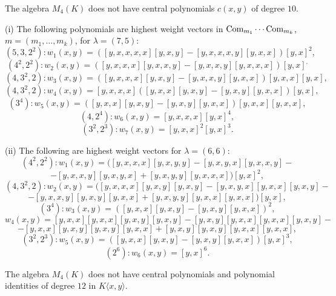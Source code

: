 \documentclass[10pt,a4paper]{amsart}
\begin{document}
\begin{proposition}\label{no central polynomials of degree 10}
The algebra $M_4(K)$ does not have central polynomials $c(x,y)$ of degree $10$.
\end{proposition}

\begin{lemma}\label{HWV of degree 12}
{\rm (i)} The following polynomials are highest weight vectors in $\text{\rm Com}_{m_1}\cdots \text{\rm Com}_{m_k}$, $m=(m_1,\ldots,m_k)$, for $\lambda=(7,5)$:
\[
(5,3,2^2):w_1(x,y)=([y,x,x,x,x][y,x,y]-[y,x,x,x,y][y,x,x])[y,x]^2, %
\]
\[
(4^2,2^2):w_2(x,y)=([y,x,x,x][y,x,x,y]-[y,x,x,y][y,x,x,x])[y,x]^, %
\]
\[
(4,3^2,2):w_3(x,y)=([y,x,x,x][y,x,y]-[y,x,x,y][y,x,x])[y,x,x][y,x], %
\]
\[
(4,3^2,2):w_4(x,y)=[y,x,x,x]([y,x,x][y,x,y]-[y,x,y][y,x,x])[y,x], %
\]
\[
(3^4):w_5(x,y)=([y,x,x][y,x,y]-[y,x,y][y,x,x])[y,x,x][y,x,x],%
\]
\[
(4,2^4):w_6(x,y)=[y,x,x,x][y,x]^4,%
\]
\[
(3^2,2^3):w_7(x,y)=[y,x,x]^2[y,x]^3. %
\]

{\rm (ii)} The following are highest weight vectors for $\lambda=(6,6)$:
\[
(4^2,2^2):w_1(x,y)=([y,x,x,x][y,x,y,y]-[y,x,y,x][y,x,x,y]-
\]
\[
-[y,x,x,y][y,x,y,x]+[y,x,y,y][y,x,x,x])[y,x]^2,
\]
\[
(4,3^2,2):w_2(x,y)=([y,x,x,x][y,x,y][y,x,y]-[y,x,y,x][y,x,x][y,x,y]-
\]
\[
-[y,x,x,y][y,x,y][y,x,x]+[y,x,y,y][y,x,x][y,x,x])[y,x],
\]
\[
(3^4):w_3(x,y)=([y,x,x][y,x,y]-[y,x,y][y,x,x])^2,
\]
\[
w_4(x,y)=[y,x,x][y,x,x][y,x,y][y,x,y]-[y,x,y][y,x,x][y,x,x][y,x,y]-
\]
\[
-[y,x,x][y,x,y][y,x,y][y,x,x]+[y,x,y][y,x,y][y,x,x][y,x,x],
\]
\[
(3^2,2^3):w_5(x,y)=([y,x,x][y,x,y]-[y,x,y][y,x,x])[y,x]^3,
\]
\[
(2^6):w_6(x,y)=[y,x]^6.
\]
\end{lemma}

\begin{proposition}\label{no central polynomials of degree 12}
The algebra $M_4(K)$ does not have central polynomials and polynomial identities of degree $12$ in $K\langle x,y\rangle$.
\end{proposition}
\end{document}
